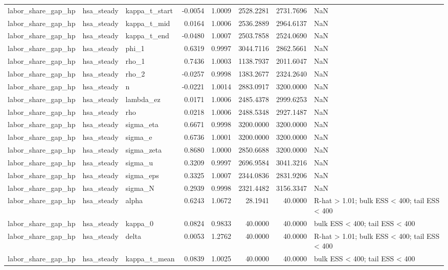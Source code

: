 \begin{tabular}{lllrrrrl}
labor\_share\_gap\_hp & hsa\_steady & kappa\_t\_start & -0.0054 & 1.0009 & 2528.2281 & 2731.7696 & NaN \\
labor\_share\_gap\_hp & hsa\_steady & kappa\_t\_mid & 0.0164 & 1.0006 & 2536.2889 & 2964.6137 & NaN \\
labor\_share\_gap\_hp & hsa\_steady & kappa\_t\_end & -0.0480 & 1.0007 & 2503.7858 & 2524.0690 & NaN \\
labor\_share\_gap\_hp & hsa\_steady & phi\_1 & 0.6319 & 0.9997 & 3044.7116 & 2862.5661 & NaN \\
labor\_share\_gap\_hp & hsa\_steady & rho\_1 & 0.7436 & 1.0003 & 1138.7937 & 2011.6047 & NaN \\
labor\_share\_gap\_hp & hsa\_steady & rho\_2 & -0.0257 & 0.9998 & 1383.2677 & 2324.2640 & NaN \\
labor\_share\_gap\_hp & hsa\_steady & n & -0.0221 & 1.0014 & 2883.0917 & 3200.0000 & NaN \\
labor\_share\_gap\_hp & hsa\_steady & lambda\_ez & 0.0171 & 1.0006 & 2485.4378 & 2999.6253 & NaN \\
labor\_share\_gap\_hp & hsa\_steady & rho & 0.0218 & 1.0006 & 2488.5348 & 2927.1487 & NaN \\
labor\_share\_gap\_hp & hsa\_steady & sigma\_eta & 0.6671 & 0.9998 & 3200.0000 & 3200.0000 & NaN \\
labor\_share\_gap\_hp & hsa\_steady & sigma\_e & 0.6736 & 1.0001 & 3200.0000 & 3200.0000 & NaN \\
labor\_share\_gap\_hp & hsa\_steady & sigma\_zeta & 0.8680 & 1.0000 & 2850.6688 & 3200.0000 & NaN \\
labor\_share\_gap\_hp & hsa\_steady & sigma\_u & 0.3209 & 0.9997 & 2696.9584 & 3041.3216 & NaN \\
labor\_share\_gap\_hp & hsa\_steady & sigma\_eps & 0.3325 & 1.0007 & 2344.0836 & 2831.9206 & NaN \\
labor\_share\_gap\_hp & hsa\_steady & sigma\_N & 0.2939 & 0.9998 & 2321.4482 & 3156.3347 & NaN \\
labor\_share\_gap\_hp & hsa\_steady & alpha & 0.6243 & 1.0672 & 28.1941 & 40.0000 & R-hat > 1.01; bulk ESS < 400; tail ESS < 400 \\
labor\_share\_gap\_hp & hsa\_steady & kappa\_0 & 0.0824 & 0.9833 & 40.0000 & 40.0000 & bulk ESS < 400; tail ESS < 400 \\
labor\_share\_gap\_hp & hsa\_steady & delta & 0.0053 & 1.2762 & 40.0000 & 40.0000 & R-hat > 1.01; bulk ESS < 400; tail ESS < 400 \\
labor\_share\_gap\_hp & hsa\_steady & kappa\_t\_mean & 0.0839 & 1.0025 & 40.0000 & 40.0000 & bulk ESS < 400; tail ESS < 400 \\

\end{tabular}
